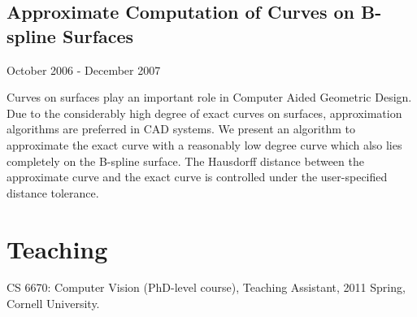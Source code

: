\documentclass[10pt,letterpaper]{article}
\renewenvironment{itemize}{
  \begin{list}{}{
    \setlength{\leftmargin}{1.5em}
    \setlength{\itemsep}{0.25em}
    \setlength{\parskip}{0pt}
    \setlength{\parsep}{0.25em}
  }
}{
  \end{list}
}
\begin{document}

\subsection*{Approximate Computation of Curves on B-spline Surfaces}
\begin{itemize}
\item October 2006 - December 2007
\item Curves on surfaces play an important role in Computer Aided Geometric Design. Due to the considerably high degree of exact curves on surfaces, approximation algorithms are preferred in CAD systems. We present an algorithm to approximate the exact curve with a reasonably low degree curve which also lies completely on the B-spline surface. The Hausdorff distance between the approximate curve and the exact curve is controlled under the user-specified distance tolerance.
\end{itemize}

\section*{Teaching}
\begin{itemize}
\item CS 6670: Computer Vision (PhD-level course), Teaching Assistant, 2011 Spring, Cornell University.
\end{itemize}
\end{document}
